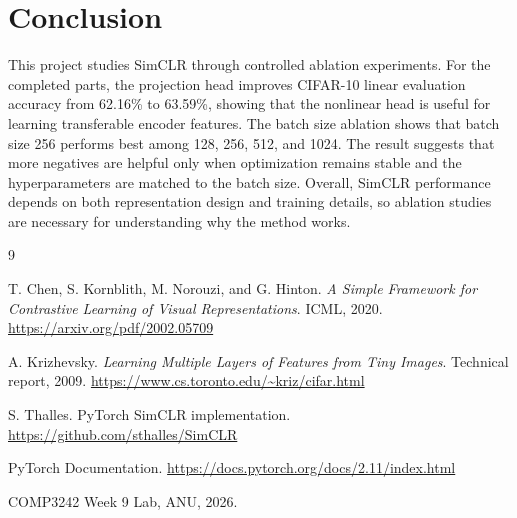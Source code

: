 \documentclass[10pt]{article}
\begin{document}
\section{Conclusion}

This project studies SimCLR through controlled ablation experiments. For the completed parts, the projection head improves CIFAR-10 linear evaluation accuracy from 62.16\% to 63.59\%, showing that the nonlinear head is useful for learning transferable encoder features. The batch size ablation shows that batch size 256 performs best among 128, 256, 512, and 1024. The result suggests that more negatives are helpful only when optimization remains stable and the hyperparameters are matched to the batch size. Overall, SimCLR performance depends on both representation design and training details, so ablation studies are necessary for understanding why the method works.

\begin{thebibliography}{9}

T. Chen, S. Kornblith, M. Norouzi, and G. Hinton.
\textit{A Simple Framework for Contrastive Learning of Visual Representations}.
ICML, 2020.
\url{https://arxiv.org/pdf/2002.05709}

A. Krizhevsky.
\textit{Learning Multiple Layers of Features from Tiny Images}.
Technical report, 2009.
\url{https://www.cs.toronto.edu/~kriz/cifar.html}

S. Thalles. PyTorch SimCLR implementation.
\url{https://github.com/sthalles/SimCLR}

PyTorch Documentation. \url{https://docs.pytorch.org/docs/2.11/index.html}

COMP3242 Week 9 Lab, ANU, 2026.

\end{thebibliography}
\end{document}
